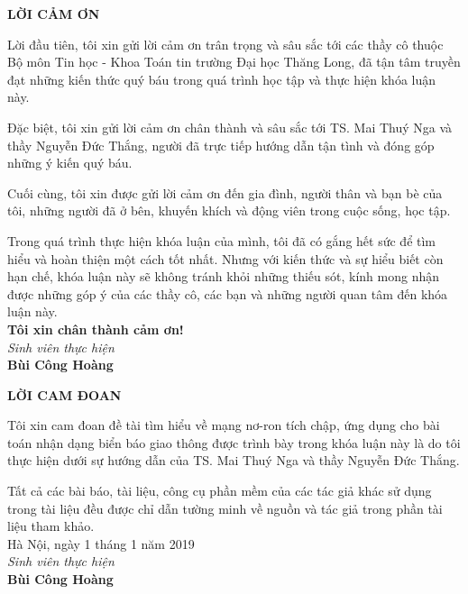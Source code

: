 \vspace*{5cm}
\begin{center}
\textbf{LỜI CẢM ƠN}
\end{center}
\hspace{6mm}Lời đầu tiên, tôi xin gửi lời cảm ơn trân trọng và sâu sắc tới các thầy cô thuộc Bộ môn Tin học - Khoa Toán tin trường Đại học Thăng Long, đã tận tâm truyền đạt những kiến thức quý báu trong quá trình học tập và thực hiện khóa luận này. \par
Đặc biệt, tôi xin gửi lời cảm ơn chân thành và sâu sắc tới  TS. Mai Thuý Nga và thầy Nguyễn Đức Thắng, người đã trực tiếp hướng dẫn tận tình và đóng góp những ý kiến quý báu. \par
Cuối cùng, tôi xin được gửi lời cảm ơn đến gia đình, người thân và bạn bè của tôi, những người đã ở bên, khuyến khích và động viên trong cuộc sống, học tập.\par
Trong quá trình thực hiện khóa luận của mình, tôi đã có gắng hết sức để tìm hiểu và hoàn thiện một cách tốt nhất. Nhưng với kiến thức và sự hiểu biết còn hạn chế, khóa luận này sẽ không tránh khỏi những thiếu sót, kính mong nhận được những góp ý của các thầy cô, các bạn và những người quan tâm đến khóa luận này.\\
[0.5cm]
\hspace*{5mm} \textbf{Tôi xin chân thành cảm ơn!}\\
[0.5cm]
\hspace*{11cm} \textit{Sinh viên thực hiện}\\
[1.5cm]
\hspace*{11.3cm} \textbf{Bùi Công Hoàng}


\newpage
\vspace*{5cm}
\begin{center}
\textbf{LỜI CAM ĐOAN}
\end{center}
\hspace{5mm} Tôi xin cam đoan đề tài tìm hiểu về mạng nơ-ron tích chập, ứng dụng cho bài toán nhận dạng biển báo giao thông được trình bày trong khóa luận này là do tôi thực hiện dưới sự hướng dẫn của TS. Mai Thuý Nga và thầy Nguyễn Đức Thắng.\par
Tất cả các bài báo, tài liệu, công cụ phần mềm của các tác giả khác sử dụng trong tài liệu đều được chỉ dẫn tường minh về nguồn và tác giả trong phần tài liệu tham khảo.\\
[1cm]
\hspace*{9cm} Hà Nội, ngày 1 tháng 1 năm 2019\\
\hspace*{10.5cm} \textit{Sinh viên thực hiện}\\
[2cm]
\hspace*{10.5cm} \textbf{Bùi Công Hoàng}\\
\thispagestyle{empty}

